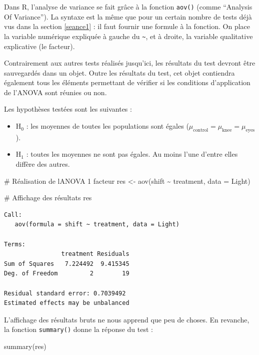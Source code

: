 \documentclass[
  a4paper,
]{article}
\newenvironment{Shaded}{\begin{snugshade}}{\end{snugshade}}
\newcommand{\AttributeTok}[1]{\textcolor[rgb]{0.00,0.34,0.68}{#1}}
\newcommand{\CommentTok}[1]{\textcolor[rgb]{0.54,0.53,0.53}{#1}}
\newcommand{\FunctionTok}[1]{\textcolor[rgb]{0.39,0.29,0.61}{#1}}
\newcommand{\NormalTok}[1]{\textcolor[rgb]{0.12,0.11,0.11}{#1}}
\newcommand{\OtherTok}[1]{\textcolor[rgb]{0.00,0.43,0.16}{#1}}
\newcommand{\SpecialCharTok}[1]{\textcolor[rgb]{0.24,0.68,0.91}{#1}}
\providecommand{\tightlist}{%
  \setlength{\itemsep}{0pt}\setlength{\parskip}{0pt}}
\begin{document}
Dans R, l'analyse de variance se fait grâce à la fonction \texttt{aov()} (comme ``Analysis Of Variance''). La syntaxe est la même que pour un certain nombre de tests déjà vus dans la section \ref{seance1} : il faut fournir une formule à la fonction. On place la variable numérique expliquée à gauche du \texttt{\textasciitilde{}}, et à droite, la variable qualitative explicative (le facteur).

Contrairement aux autres tests réalisés jusqu'ici, les résultats du test devront être sauvegardés dans un objet. Outre les résultats du test, cet objet contiendra également tous les éléments permettant de vérifier si les conditions d'application de l'ANOVA sont réunies ou non.

Les hypothèses testées sont les suivantes :

\begin{itemize}
\tightlist
\item
  H\(_0\) : les moyennes de toutes les populations sont égales (\(\mu_{\textrm{control}} = \mu_{\textrm{knee}} = \mu_{\textrm{eyes}}\)).
\item
  H\(_1\) : toutes les moyennes ne sont pas égales. Au moins l'une d'entre elles diffère des autres.
\end{itemize}

\begin{Shaded}
\begin{Highlighting}[]
\CommentTok{\# Réalisation de l\textquotesingle{}ANOVA 1 facteur}
\NormalTok{res }\OtherTok{\textless{}{-}} \FunctionTok{aov}\NormalTok{(shift }\SpecialCharTok{\textasciitilde{}}\NormalTok{ treatment, }\AttributeTok{data =}\NormalTok{ Light)}

\CommentTok{\# Affichage des résultats}
\NormalTok{res}
\end{Highlighting}
\end{Shaded}

\begin{verbatim}
Call:
   aov(formula = shift ~ treatment, data = Light)

Terms:
                treatment Residuals
Sum of Squares   7.224492  9.415345
Deg. of Freedom         2        19

Residual standard error: 0.7039492
Estimated effects may be unbalanced
\end{verbatim}

L'affichage des résultats bruts ne nous apprend que peu de choses. En revanche, la fonction \texttt{summary()} donne la réponse du test :

\begin{Shaded}
\begin{Highlighting}[]
\FunctionTok{summary}\NormalTok{(res)}
\end{Highlighting}
\end{Shaded}
\end{document}
